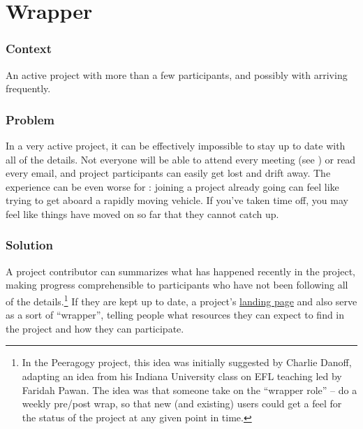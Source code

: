 \section{Wrapper}\label{sec:Wrapper}

\subsubsection*{Context} An active project with more than a few participants, and possibly with  arriving frequently.  

\subsubsection*{Problem} In a very active project, it can be effectively impossible to stay up to date with all of the details.  Not everyone will be able to attend every meeting (see ) or read every email, and project participants can easily get lost and drift away.  The experience can be even worse for : joining a project already going can feel like trying to get aboard a rapidly moving vehicle.  If you've taken time off, you may feel like things have moved on so far that they cannot catch up. 

\subsubsection*{Solution}
A project contributor can summarizes what has happened recently in the project, making progress comprehensible to participants who have not been following all of the details.\footnote{In the Peeragogy project, this idea was initially suggested by Charlie Danoff, adapting an idea from his Indiana University class on EFL teaching led by Faridah Pawan. The idea was that someone take on the ``wrapper role'' -- do a weekly pre/post wrap, so that new (and existing) users could get a feel for the status of the project at any given point in time.}  If they are kept up to date, a project's \href{http://socialmediaclassroom.com/host/peeragogy/}{landing page} and  also serve as a sort of ``wrapper'', telling people what resources they can expect to find in the project and how they can participate.  

